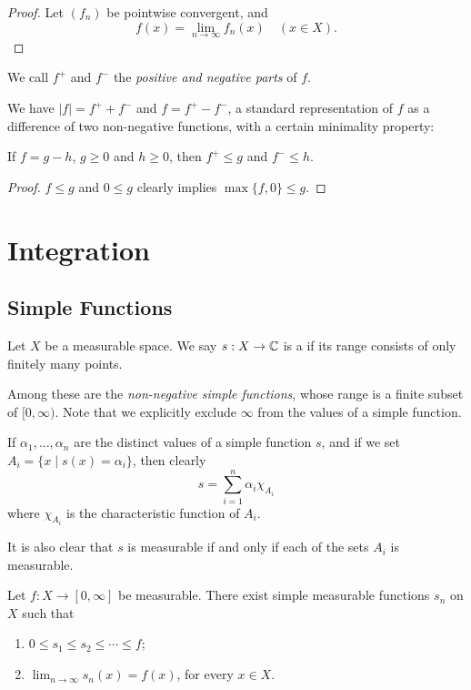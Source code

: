 \begin{proof}
Let $(f_n)$ be pointwise convergent, and
\[f(x)=\lim_{n\to\infty}f_n(x)\quad(x\in X).\]

\end{proof}

We call $f^+$ and $f^-$ the \emph{positive and negative parts} of $f$. 

We have $|f|=f^++f^-$ and $f=f^+-f^-$, a standard representation of $f$ as a difference of two non-negative functions, with a certain minimality property: 

\begin{lemma}
If $f=g-h$, $g\ge0$ and $h\ge0$, then $f^+\le g$ and $f^-\le h$.
\end{lemma}

\begin{proof}
$f\le g$ and $0\le g$ clearly implies $\max\{f,0\}\le g$. 
\end{proof}

\section{Integration}
\subsection{Simple Functions}
\begin{definition}
Let $X$ be a measurable space. We say $s:X\to\mathbb C$ is a  if its range consists of only finitely many points. 
\end{definition}

Among these are the \emph{non-negative simple functions}, whose range is a finite subset of $[0,\infty)$. Note that we explicitly exclude $\infty$ from the values of a simple function.

If $\alpha_1,\dots,\alpha_n$ are the distinct values of a simple function $s$, and if we set $A_i=\{x\mid s(x)=\alpha_i\}$, then clearly
\[s=\sum_{i=1}^{n}\alpha_i\chi_{A_i}\]
where $\chi_{A_i}$ is the characteristic function of $A_i$.

It is also clear that $s$ is measurable if and only if each of the sets $A_i$ is measurable.

\begin{proposition}
Let $f\colon X\to[0,\infty]$ be measurable. There exist simple measurable functions $s_n$ on $X$ such that
\begin{enumerate}[label=(\roman*)]
\item $0\le s_1\le s_2\le\cdots\le f$;
\item $\displaystyle\lim_{n\to\infty}s_n(x)=f(x)$, for every $x\in X$.
\end{enumerate}
\end{proposition}

